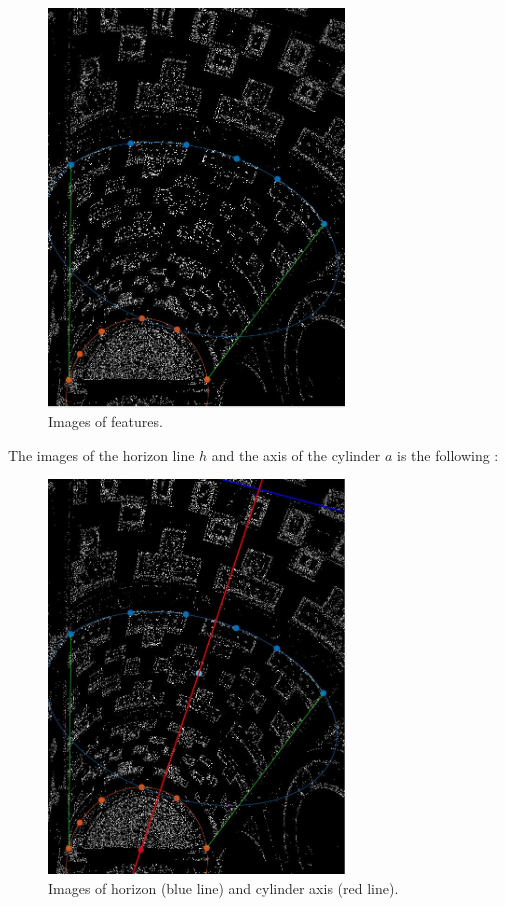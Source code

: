\documentclass[a4paper, 11pt, oneside, openright, english]{book}
\begin{document}
\begin{figure}[H]
    \centering
    \includegraphics[width=0.7\textwidth]{../images/images.JPG}
    \caption{Images of features.}
\end{figure}
The images of the horizon line $h$ and the axis of the cylinder $a$ is the following : 
\begin{figure}[H]
    \centering
    \includegraphics[width=0.7\textwidth]{../images/features.JPG}
    \caption{Images of horizon (blue line) and cylinder axis (red line).}
\end{figure}
\end{document}
